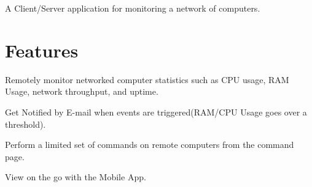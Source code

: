 A Client/\-Server application for monitoring a network of computers.

\section*{Features}


\begin{DoxyEnumerate}
\item Remotely monitor networked computer statistics such as C\-P\-U usage, R\-A\-M Usage, network throughput, and uptime.
\item Get Notified by E-\/mail when events are triggered(R\-A\-M/\-C\-P\-U Usage goes over a threshold).
\item Perform a limited set of commands on remote computers from the command page.
\item View on the go with the Mobile App. 
\end{DoxyEnumerate}